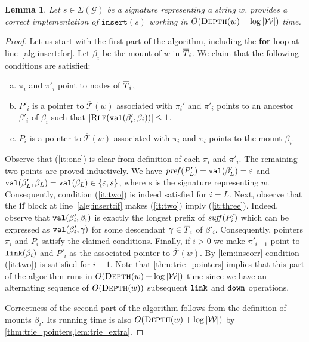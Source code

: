 \documentclass[a4paper]{article}
\newtheorem{lemma}[theorem]{Lemma}
\theoremstyle{remark}
\newcommand{\sigs}{\bar{\Sigma}}
\newcommand{\depth}{\textsc{Depth}}
\newcommand{\rle}{\textsc{Rle}}
\newcommand{\grammar}{\mathcal{G}}
\newcommand{\ustree}{\mathcal{\overline{T}}}
\newcommand{\coll}{\mathcal{W}}
\newcommand{\insertop}{\mathtt{insert}}
\newcommand{\eps}{\varepsilon}
\begin{document}
\begin{lemma}\label{lem:trie_insert}
Let $s\in\sigs(\grammar)$ be a signature representing a string $w$.
 provides a correct implementation of $\insertop(s)$
working in $O(\depth(w)+\log |\coll|)$ time.
\end{lemma}
\begin{proof}
Let us start with the first part of the algorithm, including the \textbf{for} loop at line~\ref{alg:insert:for}.
Let $\beta_i$ be the mount of $w$ in $\overline{T}_i$.
We claim that the following conditions are satisfied:
 \begin{enumerate}[(a)]
   \item\label{it:one} $\pi_i$ and $\pi'_i$ point to nodes of $\overline{T}_i$,
   \item\label{it:two} $P'_i$ is a pointer to $\ustree(w)$ associated with $\pi_i'$ and $\pi'_i$ points to an ancestor $\beta'_i$ of $\beta_i$ such that $|\rle(\tval(\beta'_i,\beta_i))|\le 1$.
     \item\label{it:three} $P_i$ is a pointer to $\ustree(w)$ associated with $\pi_i$ and $\pi_i$ points to the mount $\beta_i$.
 \end{enumerate}

Observe that (\ref{it:one}) is clear from definition of each $\pi_i$ and $\pi'_i$.
The remaining two points are proved inductively.
We have $\itstring(P'_L)=\tval(\beta'_L)=\eps$ and $\tval(\beta'_L,\beta_L)=\tval(\beta_L)\in \{\eps,s\}$, where $s$ is the signature representing $w$.
Consequently, condition (\ref{it:two}) is indeed satisfied for $i=L$.
Next, observe that the \textbf{if} block at line~\ref{alg:insert:if} makes (\ref{it:two}) imply (\ref{it:three}).
Indeed, observe that $\mathtt{val}(\beta'_i,\beta_i)$ is exactly the longest prefix of $\mathit{suff}(P'_i)$ which can be expressed
as $\mathtt{val}(\beta'_i,\gamma)$ for some descendant $\gamma\in \overline{T}_i$ of $\beta'_i$.
Consequently, pointers $\pi_i$ and $P_i$ satisfy the claimed conditions.
Finally, if $i>0$ we make $\pi'_{i-1}$ point to $\mathtt{link}(\beta_i)$ and $P'_i$ as the associated pointer to $\ustree(w)$.
By \cref{lem:inscorr} condition (\ref{it:two}) is satisfied for $i-1$.
Note that \cref{thm:trie_pointers} implies that this part of the algorithm runs in $O(\depth(w)+\log |\coll|)$
time since we have an alternating sequence of $O(\depth(w))$ subsequent $\mathtt{link}$ and $\mathtt{down}$ operations.

Correctness of the second part of the algorithm follows from the definition of mounts $\beta_i$.
Its running time is also $O(\depth(w)+\log |\coll|)$ by \cref{thm:trie_pointers,lem:trie_extra}.
\end{proof}
\end{document}
